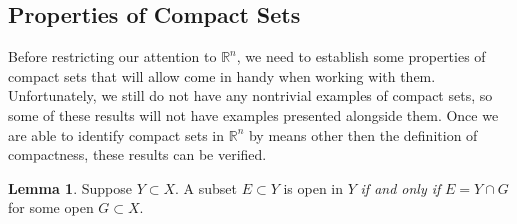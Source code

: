 \documentclass{article}
\newcommand{\R}{\mathbb{R}}
\theoremstyle{definition}
\newtheorem{lemma}{Lemma}[section]
\begin{document}
\subsection{Properties of Compact Sets}
Before restricting our attention to $ \R^n $, we need to establish some properties of compact sets that will allow come in handy when working with them. Unfortunately, we still do not have any nontrivial examples of compact sets, so some of these results will not have examples presented alongside them. Once we are able to identify compact sets in $ \R^n $ by means other then the definition of compactness, these results can be verified. 
\begin{lemma}
	Suppose $ Y\subset X $. A subset $ E\subset Y$ is open in $ Y $ \textit{if and only if} $ E=Y\cap G $ for some open $ G\subset X $. 
\end{lemma}
\end{document}
